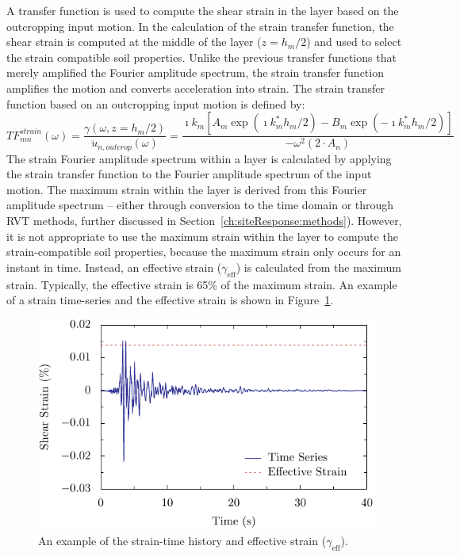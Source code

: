 \documentclass[11pt]{report}
\begin{document}
A transfer function is used to compute the shear strain in the layer based on the outcropping input
motion.  In the calculation of the strain transfer function, the shear strain is computed at the middle of
the layer ($z=h_m/2$) and used to select the strain compatible soil properties.  Unlike the previous
transfer functions that merely amplified the Fourier amplitude spectrum, the strain transfer
function amplifies the motion and converts acceleration into strain.
The strain transfer function based on an outcropping input motion is defined by:
\begin{equation}
  TF_{mn}^{strain}(\omega) = \frac{\gamma(\omega, z=h_m/2)}{\ddot{u}_{n,outcrop}(\omega)} =
  \frac{\imath k_m \left[
  A_m \exp\left( \imath k_m^* h_m / 2 \right) - B_m \exp\left( -\imath k_m^* h_m / 2 \right) \right]
  }{-\omega^2 \left( 2 \cdot A_n \right)}
  \label{eq:strain_tf}
\end{equation}
The strain Fourier amplitude spectrum within a layer is calculated by applying the strain transfer
function to the Fourier amplitude spectrum of the input motion.  The maximum strain within the layer
is derived from this Fourier amplitude spectrum -- either through conversion to the time domain or
through RVT methods, further discussed in Section~\ref{ch:siteResponse:methods}).  However, it is
not appropriate to use the maximum strain within the layer to compute the strain-compatible soil
properties, because the maximum strain only occurs for an instant in time.  Instead, an effective
strain ($\gamma_{\mathrm{eff}}$) is calculated from the maximum strain.  Typically, the effective
strain is 65\% of the maximum strain. An example of a strain time-series and the effective strain is
shown in Figure~\ref{fig:siteResponse:strainTH}.

\begin{figure}[tb]
  \begin{center}
	\includegraphics[width=\linewidth]{figures/siteResponse/sra-strain-ts.pdf}
  \end{center}
  \caption{An example of the strain-time history and effective strain ($\gamma_{\mathrm{eff}}$).}
  \label{fig:siteResponse:strainTH}
\end{figure}
\end{document}

